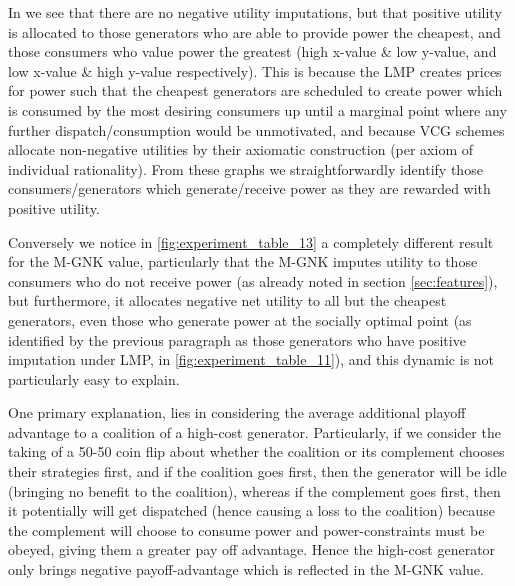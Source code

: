 In \DIFdelbegin {}\DIFdelend \DIFaddbegin {}\DIFaddend we see that there are no negative utility imputations, but that positive utility is allocated to those generators who are able to provide power the cheapest, and those consumers who value power the greatest (high x-value \& low y-value, and low x-value \& high y-value respectively).
This is because the LMP creates prices for power such that the cheapest generators are scheduled to create power which is consumed by the most desiring consumers up until a marginal point where any further dispatch/consumption would be unmotivated, and because VCG schemes allocate non-negative utilities by their axiomatic construction (per axiom of individual rationality).
From these graphs we straightforwardly identify those consumers/generators which generate/receive power as they are rewarded with positive utility.

Conversely we notice in \DIFdelbegin {}\DIFdelend \DIFaddbegin {}\DIFaddend \ref{fig:experiment_table_13} a completely different result for the M-GNK value, particularly that the M-GNK imputes utility to those consumers who do not receive power (as already noted in section \ref{sec:features}), but furthermore, it allocates negative net utility to all but the cheapest generators, even those who generate power at the socially optimal point (as identified by the previous paragraph as those generators who have positive imputation under LMP, in \DIFdelbegin {}\DIFdelend \DIFaddbegin {}\DIFaddend \ref{fig:experiment_table_11}), and this dynamic is not particularly easy to explain.

One primary explanation, lies in considering the average additional playoff advantage to a coalition of a high-cost generator.
Particularly, if we consider the taking of a 50-50 coin flip about whether the coalition or its complement chooses their strategies first, and if the coalition goes first, then the generator will be idle (bringing no benefit to the coalition), whereas if the complement goes first, then it potentially will get dispatched (hence causing a loss to the coalition) because the complement will choose to consume power and power-constraints must be obeyed, giving them a greater pay off advantage.
Hence the high-cost generator only brings negative payoff-advantage which is reflected in the M-GNK value.

